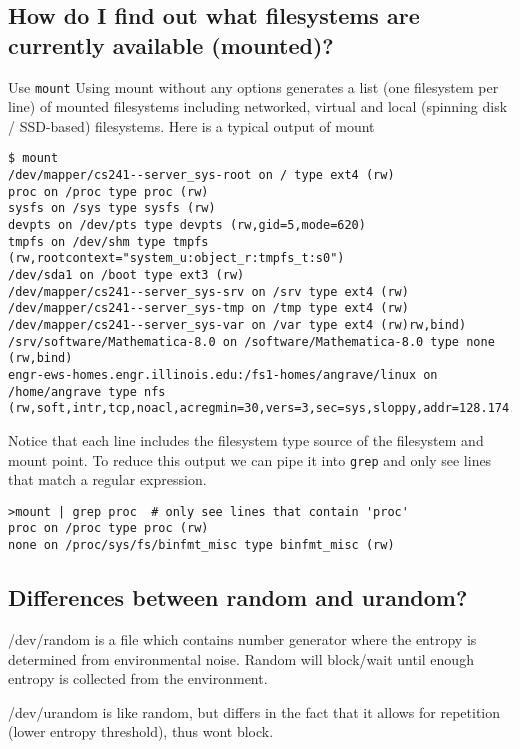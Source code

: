 \subsection{How do I find out what filesystems are currently available
(mounted)?}\label{how-do-i-find-out-what-filesystems-are-currently-available-mounted}

Use \texttt{mount} Using mount without any options generates a list (one
filesystem per line) of mounted filesystems including networked, virtual
and local (spinning disk / SSD-based) filesystems. Here is a typical
output of mount

\begin{verbatim}
$ mount
/dev/mapper/cs241--server_sys-root on / type ext4 (rw)
proc on /proc type proc (rw)
sysfs on /sys type sysfs (rw)
devpts on /dev/pts type devpts (rw,gid=5,mode=620)
tmpfs on /dev/shm type tmpfs (rw,rootcontext="system_u:object_r:tmpfs_t:s0")
/dev/sda1 on /boot type ext3 (rw)
/dev/mapper/cs241--server_sys-srv on /srv type ext4 (rw)
/dev/mapper/cs241--server_sys-tmp on /tmp type ext4 (rw)
/dev/mapper/cs241--server_sys-var on /var type ext4 (rw)rw,bind)
/srv/software/Mathematica-8.0 on /software/Mathematica-8.0 type none (rw,bind)
engr-ews-homes.engr.illinois.edu:/fs1-homes/angrave/linux on /home/angrave type nfs (rw,soft,intr,tcp,noacl,acregmin=30,vers=3,sec=sys,sloppy,addr=128.174.252.102)
\end{verbatim}

Notice that each line includes the filesystem type source of the
filesystem and mount point. To reduce this output we can pipe it into
\texttt{grep} and only see lines that match a regular expression.

\begin{verbatim}
>mount | grep proc  # only see lines that contain 'proc'
proc on /proc type proc (rw)
none on /proc/sys/fs/binfmt_misc type binfmt_misc (rw)
\end{verbatim}

\subsection{Differences between random and
urandom?}\label{differences-between-random-and-urandom}

/dev/random is a file which contains number generator where the entropy
is determined from environmental noise. Random will block/wait until
enough entropy is collected from the environment.

/dev/urandom is like random, but differs in the fact that it allows for
repetition (lower entropy threshold), thus wont block.


